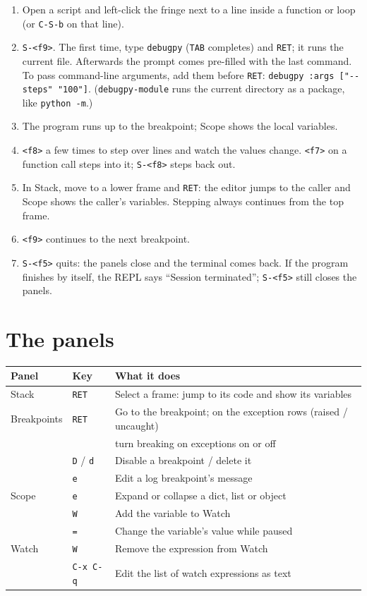 \documentclass[11pt]{article}
\begin{document}
\begin{enumerate}
\item Open a script and left-click the fringe next to a line inside a function
or loop (or \texttt{C-S-b} on that line).
\item \texttt{S-<f9>}.  The first time, type \texttt{debugpy} (\texttt{TAB} completes) and \texttt{RET}; it
runs the current file.  Afterwards the prompt comes pre-filled with the
last command.  To pass command-line arguments, add them before \texttt{RET}:
\texttt{debugpy :args ["-{}-{}steps" "100"]}.  (\texttt{debugpy-module} runs the current
directory as a package, like \texttt{python -m}.)
\item The program runs up to the breakpoint; Scope shows the local variables.
\item \texttt{<f8>} a few times to step over lines and watch the values change.
\texttt{<f7>} on a function call steps into it; \texttt{S-<f8>} steps back out.
\item In Stack, move to a lower frame and \texttt{RET}: the editor jumps to the caller
and Scope shows the caller's variables.  Stepping always continues from
the top frame.
\item \texttt{<f9>} continues to the next breakpoint.
\item \texttt{S-<f5>} quits: the panels close and the terminal comes back.  If the
program finishes by itself, the REPL says ``Session terminated''; \texttt{S-<f5>}
still closes the panels.
\end{enumerate}
\section{The panels}
\label{sec:org3592ab2}

\begin{center}
\begin{tabular}{lll}
Panel & Key & What it does\\
\hline
Stack & \texttt{RET} & Select a frame: jump to its code and show its variables\\
Breakpoints & \texttt{RET} & Go to the breakpoint; on the exception rows (raised / uncaught)\\
 &  & turn breaking on exceptions on or off\\
 & \texttt{D} / \texttt{d} & Disable a breakpoint / delete it\\
 & \texttt{e} & Edit a log breakpoint's message\\
Scope & \texttt{e} & Expand or collapse a dict, list or object\\
 & \texttt{W} & Add the variable to Watch\\
 & \texttt{=} & Change the variable's value while paused\\
Watch & \texttt{W} & Remove the expression from Watch\\
 & \texttt{C-x C-q} & Edit the list of watch expressions as text\\
\end{tabular}
\end{center}
\end{document}
